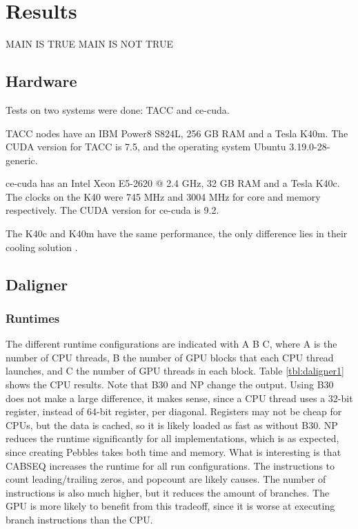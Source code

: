 \documentclass[../main/thesis.tex]{subfiles}
\begin{document}
\chapter{Results}
\ifdefined\main
\acresetall
MAIN IS TRUE
\newcommand{\codePath}{../5_results/code/}
\newcommand{\figPath}{../5_results/figures/}
\else
MAIN IS NOT TRUE

\fi

\section{Hardware}
Tests on two systems were done: TACC and ce-cuda.

TACC nodes have an IBM Power8 S824L, 256 GB RAM and a Tesla K40m.
The CUDA version for TACC is 7.5, and the operating system Ubuntu 3.19.0-28-generic.

ce-cuda has an Intel Xeon E5-2620 @ 2.4 GHz, 32 GB RAM and a Tesla K40c.
The clocks on the K40 were 745 MHz and 3004 MHz for core and memory respectively.
The CUDA version for ce-cuda is 9.2.

The K40c and K40m have the same performance, the only difference lies in their cooling solution \cite{K40m}.

\section{Daligner}
\subsection{Runtimes}
The different runtime configurations are indicated with A B C, where A is the number of CPU threads, B the number of GPU blocks that each CPU thread launches, and C the number of GPU threads in each block.
Table \ref{tbl:daligner1} shows the CPU results.
Note that B30 and NP change the output.
Using B30 does not make a large difference, it makes sense, since a CPU thread uses a 32-bit register, instead of 64-bit register, per diagonal.
Registers may not be cheap for CPUs, but the data is cached, so it is likely loaded as fast as without B30.
NP reduces the runtime significantly for all implementations, which is as expected, since creating Pebbles takes both time and memory.
What is interesting is that CABSEQ increases the runtime for all run configurations.
The instructions to count leading/trailing zeros, and popcount are likely causes.
The number of instructions is also much higher, but it reduces the amount of branches.
The GPU is more likely to benefit from this tradeoff, since it is worse at executing branch instructions than the CPU.
\end{document}
